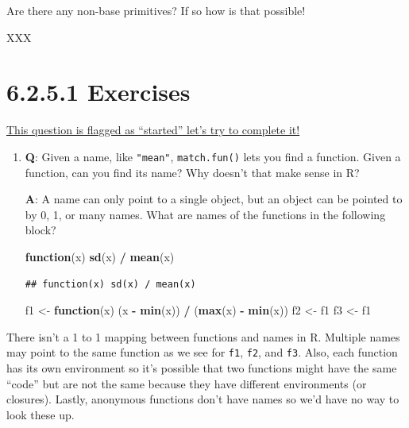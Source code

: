 \documentclass[]{book}
\newenvironment{Shaded}{\begin{snugshade}}{\end{snugshade}}
\newcommand{\ControlFlowTok}[1]{\textcolor[rgb]{0.13,0.29,0.53}{\textbf{#1}}}
\newcommand{\KeywordTok}[1]{\textcolor[rgb]{0.13,0.29,0.53}{\textbf{#1}}}
\newcommand{\NormalTok}[1]{#1}
\newcommand{\OperatorTok}[1]{\textcolor[rgb]{0.81,0.36,0.00}{\textbf{#1}}}
\newcommand{\StringTok}[1]{\textcolor[rgb]{0.31,0.60,0.02}{#1}}
\begin{document}
Are there any non-base primitives? If so how is that possible!

XXX

\hypertarget{exercises-2}{%
\section*{6.2.5.1 Exercises}\label{exercises-2}}

\href{https://github.com/Tazinho/Advanced-R-Solutions/blob/5043d9b06c7469a010c568ecb85e12bedca75207/2-06-Functions.Rmd\#L9}{This question is flagged as ``started'' let's try to complete it!}

\begin{enumerate}
\def\labelenumi{\arabic{enumi}.}
\item
  \textbf{{Q}}: Given a name, like \texttt{"mean"}, \texttt{match.fun()} lets you find a function. Given a function, can you find its name? Why doesn't that make sense in R?

  \textbf{{A}}: A name can only point to a single object, but an object can be pointed to by 0, 1, or many names. What are names of the functions in the following block?

\begin{Shaded}
\begin{Highlighting}[]
  \ControlFlowTok{function}\NormalTok{(x) }\KeywordTok{sd}\NormalTok{(x) }\OperatorTok{/}\StringTok{ }\KeywordTok{mean}\NormalTok{(x)}
\end{Highlighting}
\end{Shaded}

\begin{verbatim}
## function(x) sd(x) / mean(x)
\end{verbatim}

\begin{Shaded}
\begin{Highlighting}[]
\NormalTok{  f1 <-}\StringTok{ }\ControlFlowTok{function}\NormalTok{(x) (x }\OperatorTok{-}\StringTok{ }\KeywordTok{min}\NormalTok{(x)) }\OperatorTok{/}\StringTok{ }\NormalTok{(}\KeywordTok{max}\NormalTok{(x) }\OperatorTok{-}\StringTok{ }\KeywordTok{min}\NormalTok{(x))}
\NormalTok{  f2 <-}\StringTok{ }\NormalTok{f1}
\NormalTok{  f3 <-}\StringTok{ }\NormalTok{f1}
\end{Highlighting}
\end{Shaded}
\end{enumerate}

There isn't a 1 to 1 mapping between functions and names in R. Multiple names may point to the same function as we see for \texttt{f1}, \texttt{f2}, and \texttt{f3}. Also, each function has its own environment so it's possible that two functions might have the same ``code'' but are not the same because they have different environments (or closures). Lastly, anonymous functions don't have names so we'd have no way to look these up.
\end{document}
